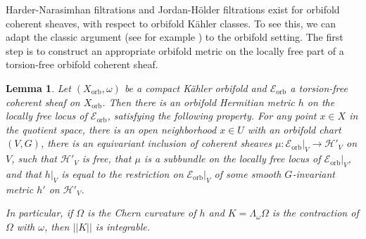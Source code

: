 \documentclass[12pt]{amsart}
\newcommand{\<}{\leq}
\def\mcE{\mathcal{E}}
\def\mcF{\mathcal{F}}
\def\mcH{\mathcal{H}}
\newtheorem{lemma}[theorem]{Lemma}
\theoremstyle{remark}
\theoremstyle{definition}
\theoremstyle{definition}
\numberwithin{equation}{section}
\theoremstyle{definition}
\theoremstyle{definition}
\def\orb{\mathrm{orb}}
\begin{document}



Harder-Narasimhan filtrations and Jordan-H\"older filtrations  exist  for orbifold coherent sheaves, with respect to orbifold K\"ahler classes.  
To see this, we can adapt the classic argument (see for example \cite[Section V.7]{Kob14}) to the orbifold setting. 
The first step is to construct an appropriate orbifold metric on the locally free part of a torsion-free orbifold coherent sheaf. 


\begin{lemma} 
\label{lemma:construction-metric-1}
Let $(X_{\orb},\omega)$ be a compact K\"ahler orbifold and $\mcE_{\orb}$ a  torsion-free coherent sheaf on $X_{\orb}$. 
Then there is an orbifold Hermitian metric $h$ on the locally free locus of $\mcE_{\orb}$, satisfying the following property. 
For any point $x\in X$ in the quotient space, there is an   open neighborhood $x\in U$ with an orbifold chart $(V, G)$,  
there is an equivariant inclusion of coherent sheaves 
$\mu \colon \mcE_{\orb}|_V  \to \mcH'_V$  on $V$, 
such that $\mcH'_V$ is  free, 
that $\mu$ is a subbundle on the locally free locus of $\mcE_\orb|_V$, 
and that $h|_V$ is equal to the restriction on $\mcE_{\orb}|_V$ of some smooth $G$-invariant metric $h'$ on $\mcH'_V$.  

In particular, if  $\Omega$ is the Chern curvature of $h$ and $K=\Lambda_{\omega} \Omega$ is the contraction of $\Omega$ with $\omega$, then $||K||$ is integrable.
\end{lemma}
\end{document}

